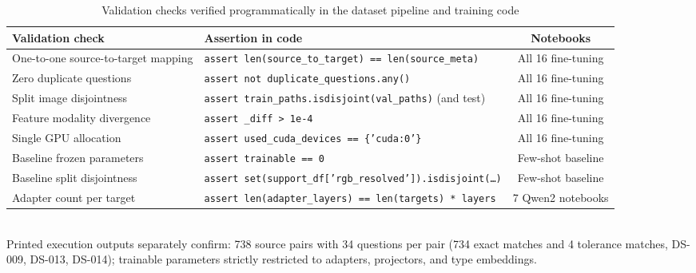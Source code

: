 \begin{table}[htbp]
  \centering
  \caption{Validation checks verified programmatically in the dataset pipeline and training code}
  \label{tab:tests}
  \small
  \begin{tabular}{P{1.8in}P{2.4in}c}
    \toprule
    \textbf{Validation check} & \textbf{Assertion in code} & \textbf{Notebooks} \\
    \midrule
    One-to-one source-to-target mapping & \texttt{assert len(source\_to\_target) == len(source\_meta)} & All 16 fine-tuning \\
    Zero duplicate questions & \texttt{assert not duplicate\_questions.any()} & All 16 fine-tuning \\
    Split image disjointness & \texttt{assert train\_paths.isdisjoint(val\_paths)} (and test) & All 16 fine-tuning \\
    Feature modality divergence & \texttt{assert \_diff > 1e-4} & All 16 fine-tuning \\
    Single GPU allocation & \texttt{assert used\_cuda\_devices == \{'cuda:0'\}} & All 16 fine-tuning \\
    Baseline frozen parameters & \texttt{assert trainable == 0} & Few-shot baseline \\
    Baseline split disjointness & \texttt{assert set(support\_df['rgb\_resolved']).isdisjoint(\dots)} & Few-shot baseline \\
    Adapter count per target & \texttt{assert len(adapter\_layers) == len(targets) * layers} & 7 Qwen2 notebooks \\
    \bottomrule
  \end{tabular}\\[2pt]
  {\footnotesize Printed execution outputs separately confirm: 738 source pairs with 34 questions per pair (734 exact matches and 4 tolerance matches, DS-009, DS-013, DS-014); trainable parameters strictly restricted to adapters, projectors, and type embeddings.}
\end{table}
